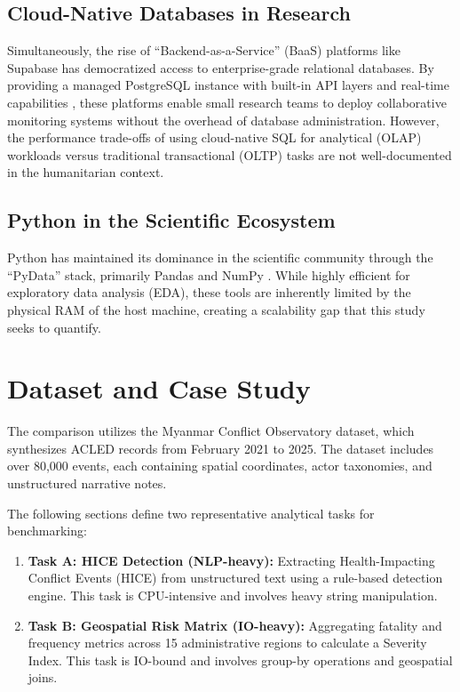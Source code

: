 \documentclass[conference]{IEEEtran}
\begin{document}
\subsection{Cloud-Native Databases in Research}
Simultaneously, the rise of ``Backend-as-a-Service'' (BaaS) platforms like Supabase has democratized access to enterprise-grade relational databases. By providing a managed PostgreSQL instance with built-in API layers and real-time capabilities \cite{supabase2024}, these platforms enable small research teams to deploy collaborative monitoring systems without the overhead of database administration. However, the performance trade-offs of using cloud-native SQL for analytical (OLAP) workloads versus traditional transactional (OLTP) tasks are not well-documented in the humanitarian context.

\subsection{Python in the Scientific Ecosystem}
Python has maintained its dominance in the scientific community through the ``PyData'' stack, primarily Pandas and NumPy \cite{mckinney2010data,vanderwalt2011numpy}. While highly efficient for exploratory data analysis (EDA), these tools are inherently limited by the physical RAM of the host machine, creating a scalability gap that this study seeks to quantify.

\section{Dataset and Case Study}

The comparison utilizes the Myanmar Conflict Observatory dataset, which synthesizes ACLED records from February 2021 to 2025. The dataset includes over 80,000 events, each containing spatial coordinates, actor taxonomies, and unstructured narrative notes. 

The following sections define two representative analytical tasks for benchmarking:
\begin{enumerate}
    \item \textbf{Task A: HICE Detection (NLP-heavy):} Extracting Health-Impacting Conflict Events (HICE) from unstructured text using a rule-based detection engine. This task is CPU-intensive and involves heavy string manipulation.
    \item \textbf{Task B: Geospatial Risk Matrix (IO-heavy):} Aggregating fatality and frequency metrics across 15 administrative regions to calculate a Severity Index. This task is IO-bound and involves group-by operations and geospatial joins.
\end{enumerate}
\end{document}
